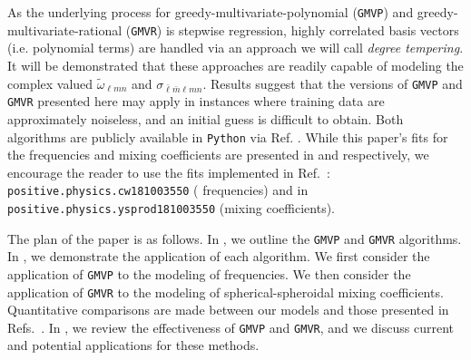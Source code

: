 \documentclass[twocolumn,aps,prd,floatfix,preprintnumbers,a4paper,nofootinbib,
superscriptaddress,10pt]{revtex4-1}
\newcommand{\cw}{\tilde{\omega}}
\def\lmn{_{\ell m n}}
\def\LMlmn{_{\bar{\ell} \bar{m} \ell m n}}
\def\gmvp#1{greedy-multivariate-polynomial#1
  (\texttt{GMVP}#1)\gdef\gmvp{\texttt{GMVP}}}
\def\gmvr#1{greedy-multivariate-rational#1
  (\texttt{GMVR}#1)\gdef\gmvr{\texttt{GMVR}}}
\begin{document}
%
As the underlying process for \gmvp{} and \gmvr{} is stepwise regression, highly correlated basis vectors (i.e. polynomial terms) are handled via an approach we will call \textit{degree tempering}.
%
It will be demonstrated that these approaches are readily capable of modeling the complex valued $\cw\lmn$ and $\sigma\LMlmn$.
%
Results suggest that the versions of \gmvp{} and \gmvr{} presented here may apply in instances where training data are approximately noiseless, and an initial guess is difficult to obtain.
%
Both algorithms are publicly available in \texttt{Python} via Ref. \cite{lionel_london_2018_1402516}.
%
While this paper's fits for the \qnm{} frequencies and mixing coefficients are presented in  and   respectively, we encourage the reader to use the fits implemented in Ref.~\cite{lionel_london_2018_1402516}: \texttt{positive.physics.cw181003550} (\qnm{} frequencies) and in \texttt{positive.physics.ysprod181003550} (mixing coefficients).
%
%
\par The plan of the paper is as follows.
%
In , we outline the \gmvp{} and \gmvr{} algorithms.
%
In , we demonstrate the application of each algorithm.
%
We first consider the application of \gmvp{} to the modeling of \qnm{} frequencies.
%
We then consider the application of \gmvr{} to the modeling of spherical-spheroidal mixing coefficients.
%
Quantitative comparisons are made between our models and those presented in Refs.~\cite{Berti:2005ys, Berti:2014fga}.
%
In , we review the effectiveness of \gmvp{} and \gmvr{}, and we discuss current and potential applications for these methods.
%
%
\end{document}
